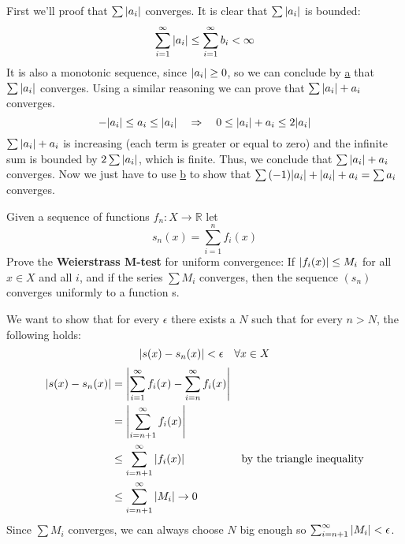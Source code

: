 \documentclass{article}
\def\R{\mathbb{R}}
\DeclarePairedDelimiter\abs{\lvert}{\rvert}%
\begin{document}
    \noindent
    First we'll proof that $\sum{\abs{a_i}}$ converges. It is clear that $\sum{\abs{a_i}}$ is bounded:
    \begin{equation*}
        \sum_{i=1}^\infty{\abs{a_i}} \leq \sum_{i=1}^\infty{b_i} < \infty
    \end{equation*}
    It is also a monotonic sequence, since $\abs{a_i} \geq 0$, so we can conclude by \hyperref[21.11a]{a} that $\sum{\abs{a_i}}$ converges. Using a similar reasoning we can prove that $\sum{\abs{a_i} + a_i}$ converges. 
    \begin{equation*}
        -\abs{a_i} \leq a_i \leq \abs{a_i} \quad \Rightarrow \quad 0 \leq \abs{a_i} + a_i \leq 2\abs{a_i}
    \end{equation*}
    $\sum{\abs{a_i} + a_i}$ is increasing (each term is greater or equal to zero) and the infinite sum is bounded by $2\sum{\abs{a_i}}$, which is finite. Thus, we conclude that $\sum{\abs{a_i} + a_i}$ converges. Now we just have to use \hyperref[21.11b]{b} to show that $\sum{(-1)\abs{a_i} + \abs{a_i} + a_i} = \sum{a_i}$ converges. 
    \begin{tcolorbox}[title=Exercise d]
        Given a sequence of functions $f_n \colon X \to \R$ let
        \begin{equation*}
            s_n(x) = \sum_{i=1}^n{f_i(x)}
        \end{equation*}
        Prove the \textbf{Weierstrass M-test} for uniform convergence: If $\abs{f_i(x)} \leq M_i$ for all $x \in X$ and all $i$, and if the series $\sum{M_i}$ converges, then the sequence $(s_n)$ converges uniformly to a function s.
    \end{tcolorbox}
    \noindent
    We want to show that for every $\epsilon$ there exists a $N$ such that for every $n > N$, the following holds:
    \begin{equation*}
        \abs{s(x) - s_n(x)} < \epsilon \quad \forall x \in X
    \end{equation*}
    \begin{align*}
        \abs{s(x) - s_n(x)} &= \abs*{\sum_{i=1}^\infty{f_i(x)} - \sum_{i=n}^\infty{f_i(x)}} \\
        &= \abs*{\sum_{i=n+1}^\infty{f_i(x)}} \\
        &\leq \sum_{i=n+1}^\infty{\abs{f_i(x)}} & \text{by the triangle inequality} \\
        &\leq \sum_{i=n+1}^\infty{\abs{M_i}} \rightarrow 0
    \end{align*}
    Since $\sum{M_i}$ converges, we can always choose $N$ big enough so $\sum_{i=n+1}^\infty{\abs{M_i}} < \epsilon$.
\end{document}
